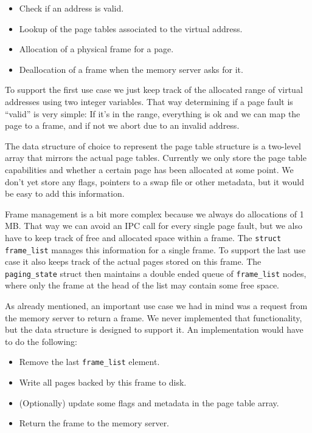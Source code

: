 \documentclass[a4paper,10pt]{article}
\begin{document}
\begin{itemize}
 \item Check if an address is valid.
 \item Lookup of the page tables associated to the virtual address.
 \item Allocation of a physical frame for a page.
 \item Deallocation of a frame when the memory server asks for it.
\end{itemize}

To support the first use case we just keep track of the allocated range of virtual addresses using two integer variables.
That way determining if a page fault is ``valid'' is very simple: 
If it's in the range, everything is ok and we can map the page to a frame, and if not we abort due to an invalid address.

The data structure of choice to represent the page table structure is a two-level array that mirrors the actual page tables.
Currently we only store the page table capabilities and whether a certain page has been allocated at some point.
We don't yet store any flags, pointers to a swap file or other metadata, but it would be easy to add this information.

Frame management is a bit more complex because we always do allocations of 1 MB.
That way we can avoid an IPC call for every single page fault, but we also have to keep track of free and allocated space within a frame.
The \lstinline!struct frame_list! manages this information for a single frame.
To support the last use case it also keeps track of the actual pages stored on this frame.
The \lstinline!paging_state! struct then maintains a double ended queue of \lstinline!frame_list! nodes, where only the frame at the head of the list may contain some free space.

As already mentioned, an important use case we had in mind was a request from the memory server to return a frame.
We never implemented that functionality, but the data structure is designed to support it.
An implementation would have to do the following:
\begin{itemize}
 \item Remove the last \lstinline!frame_list! element.
 \item Write all pages backed by this frame to disk.
 \item (Optionally) update some flags and metadata in the page table array.
 \item Return the frame to the memory server.
\end{itemize}
\end{document}
